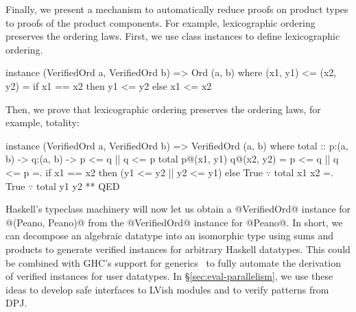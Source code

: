 Finally, we present a mechanism to automatically
reduce proofs on product types to proofs of the
product components.
%
For example, lexicographic ordering preserves the ordering laws.
%
First, we use class instances to define lexicographic ordering.
%
\begin{mcode}
    instance (VerifiedOrd a, VerifiedOrd b) => Ord (a, b) where
      (x1, y1) <= (x2, y2) = if x1 == x2 then y1 <= y2 else x1 <= x2
\end{mcode}
%
Then, we prove that lexicographic ordering
preserves the ordering laws, for example, totality:
%
\begin{mcode}
    instance (VerifiedOrd a, VerifiedOrd b) => VerifiedOrd (a, b) where
      total :: p:(a, b) -> q:(a, b) -> {p <= q || q <= p}
      total p@(x1, y1) q@(x2, y2) =  p <= q || q <= p
                                  =. if x1 == x2 then (y1 <= y2 || y2 <= y1)
                                                 else True $\because$ total x1 x2
                                  =. True $\because$ total y1 y2
                                  ** QED
\end{mcode}
%
Haskell's typeclass machinery will now let us
obtain a @VerifiedOrd@ instance for @(Peano, Peano)@
from the @VerifiedOrd@ instance for @Peano@.
%
In short, we can decompose an algebraic datatype
into an isomorphic type using sums and products
to generate verified instances for arbitrary Haskell
datatypes. This could be combined with GHC's support
for generics~\cite{ghc-generics} to fully automate the
derivation of verified instances for user datatypes.
%
In \S\ref{sec:eval-parallelism}, we use these ideas
to develop safe interfaces to LVish modules
and to verify patterns from DPJ.



